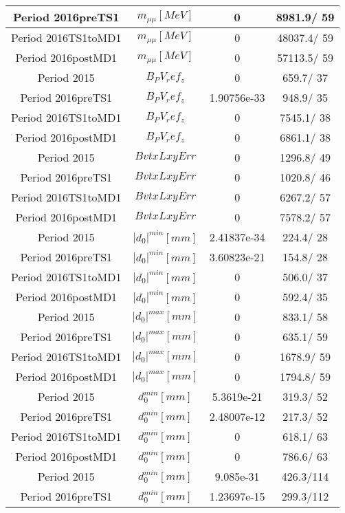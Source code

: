 \documentclass{article}
\begin{document}
\begin{longtable}{c|c|c|c}
\hline
 Period 2016preTS1 & $m_{\mu\mu} [MeV]$ & 0 & 8981.9/ 59\\
\hline
 Period 2016TS1toMD1 & $m_{\mu\mu} [MeV]$ & 0 & 48037.4/ 59\\
\hline
 Period 2016postMD1 & $m_{\mu\mu} [MeV]$ & 0 & 57113.5/ 59\\
\hline
 Period 2015 & $B_PV_ref_z$ & 0 & 659.7/ 37\\
\hline
 Period 2016preTS1 & $B_PV_ref_z$ & 1.90756e-33 & 948.9/ 35\\
\hline
 Period 2016TS1toMD1 & $B_PV_ref_z$ & 0 & 7545.1/ 38\\
\hline
 Period 2016postMD1 & $B_PV_ref_z$ & 0 & 6861.1/ 38\\
\hline
 Period 2015 & $BvtxLxyErr$ & 0 & 1296.8/ 49\\
\hline
 Period 2016preTS1 & $BvtxLxyErr$ & 0 & 1020.8/ 46\\
\hline
 Period 2016TS1toMD1 & $BvtxLxyErr$ & 0 & 6267.2/ 57\\
\hline
 Period 2016postMD1 & $BvtxLxyErr$ & 0 & 7578.2/ 57\\
\hline
 Period 2015 & $|d_{0}|^{min} [mm]$ & 2.41837e-34 & 224.4/ 28\\
\hline
 Period 2016preTS1 & $|d_{0}|^{min} [mm]$ & 3.60823e-21 & 154.8/ 28\\
\hline
 Period 2016TS1toMD1 & $|d_{0}|^{min} [mm]$ & 0 & 506.0/ 37\\
\hline
 Period 2016postMD1 & $|d_{0}|^{min} [mm]$ & 0 & 592.4/ 35\\
\hline
 Period 2015 & $|d_{0}|^{max} [mm]$ & 0 & 833.1/ 58\\
\hline
 Period 2016preTS1 & $|d_{0}|^{max} [mm]$ & 0 & 635.1/ 59\\
\hline
 Period 2016TS1toMD1 & $|d_{0}|^{max} [mm]$ & 0 & 1678.9/ 59\\
\hline
 Period 2016postMD1 & $|d_{0}|^{max} [mm]$ & 0 & 1794.8/ 59\\
\hline
 Period 2015 & $d_{0}^{min} [mm]$ & 5.3619e-21 & 319.3/ 52\\
\hline
 Period 2016preTS1 & $d_{0}^{min} [mm]$ & 2.48007e-12 & 217.3/ 52\\
\hline
 Period 2016TS1toMD1 & $d_{0}^{min} [mm]$ & 0 & 618.1/ 63\\
\hline
 Period 2016postMD1 & $d_{0}^{min} [mm]$ & 0 & 786.6/ 63\\
\hline
 Period 2015 & $d_{0}^{min} [mm]$ & 9.085e-31 & 426.3/114\\
\hline
 Period 2016preTS1 & $d_{0}^{min} [mm]$ & 1.23697e-15 & 299.3/112\\

\end{longtable}
\end{document}
